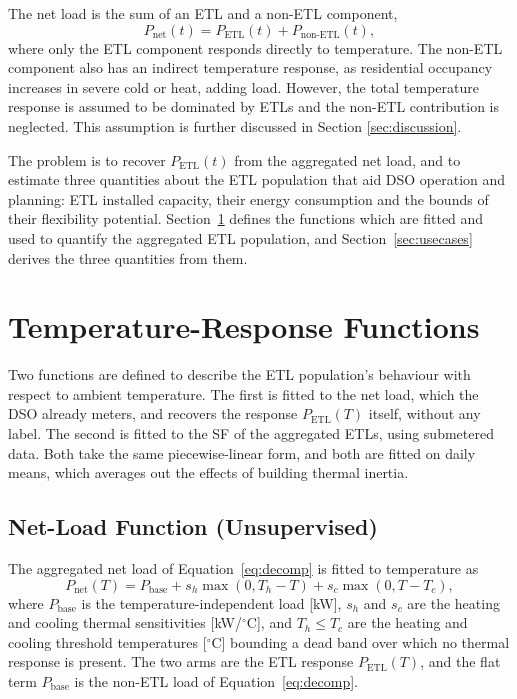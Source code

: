 \documentclass[9pt,journal,a4]{IEEEtran}
\begin{document}
The net load is the sum of an ETL and a non-ETL component,
\begin{equation}
P_{\mathrm{net}}(t) = P_{\mathrm{ETL}}(t) + P_{\text{non-ETL}}(t),
\label{eq:decomp}
\end{equation}
where only the ETL component responds directly to temperature. The non-ETL component also has an indirect temperature response, as residential occupancy increases in severe cold or heat, adding load. However, the total temperature response is assumed to be dominated by ETLs and the non-ETL contribution is neglected. This assumption is further discussed in Section \ref{sec:discussion}.

The problem is to recover $P_{\mathrm{ETL}}(t)$ from the aggregated net load, and to estimate three quantities about the ETL population that aid DSO operation and planning: ETL installed capacity, their energy consumption and the bounds of their flexibility potential. Section~\ref{sec:fits} defines the functions which are fitted and used to quantify the aggregated ETL population, and Section~\ref{sec:usecases} derives the three quantities from them.


\section{Temperature-Response Functions}
\label{sec:fits}

Two functions are defined to describe the ETL population's behaviour with respect to ambient temperature. The first is fitted to the net load, which the DSO already meters, and recovers the response $P_{\mathrm{ETL}}(T)$ itself, without any label. The second is fitted to the SF of the aggregated ETLs, using submetered data. Both take the same piecewise-linear form, and both are fitted on daily means, which averages out the effects of building thermal inertia.


\subsection{Net-Load Function (Unsupervised)}
\label{sec:fits-net}

The aggregated net load of Equation~\eqref{eq:decomp} is fitted to temperature as
\begin{equation}
P_{\mathrm{net}}(T) = P_{\mathrm{base}} + s_h \max(0, T_h - T) + s_c \max(0, T - T_c),
\label{eq:bathtub}
\end{equation}
where $P_{\mathrm{base}}$ is the temperature-independent load [kW], $s_h$ and $s_c$ are the heating and cooling thermal sensitivities [kW/$^\circ$C], and $T_h \le T_c$ are the heating and cooling threshold temperatures [$^\circ$C] bounding a dead band over which no thermal response is present. The two arms are the ETL response $P_{\mathrm{ETL}}(T)$, and the flat term $P_{\mathrm{base}}$ is the non-ETL load of Equation~\eqref{eq:decomp}.
\end{document}
